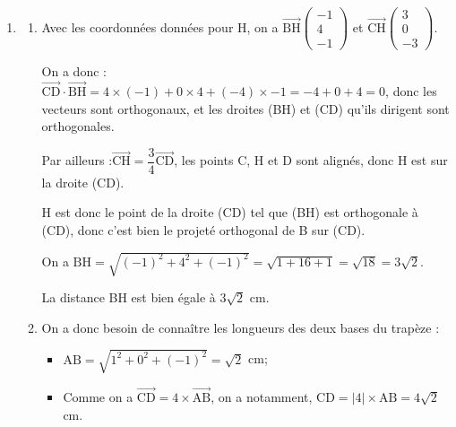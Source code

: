 \documentclass[10pt]{article}
\providecommand{\vect}[1]{\overrightarrow{#1}}
\providecommand{\Oijk}{\(\mathrm{O};\vec{\imath},\vec{\jmath},\vec{k}\)}
\begin{document}
\begin{enumerate}
\begin{enumerate}
	Dans le repère orthonormé \Oijk{}, on a donc :

	$\begin{aligned}[t] \mathrm{SI} &= \sqrt{\left(x_\mathrm{I} - x_{\mathrm{S}}\right)^2 +\left(y_\mathrm{I} - y_{\mathrm{S}}\right)^2 +\left(z_\mathrm{I} - z_{\mathrm{S}}\right)^2 } = \sqrt{\left(\dfrac{2}{3}-2\right)^2 + \left(\dfrac{1}{3} - 1\right)^2 + \left(\dfrac{8}{3} - 4\right)^2   } \\
	&=\sqrt{\left(-\dfrac{4}{3}\right)^2 + \left(-\dfrac{2}{3}\right)^2 + \left(-\dfrac{4}{3}\right)^2  } = \sqrt{\dfrac{16}{9}+\dfrac{4}{9} + \dfrac{16}{9}} = \sqrt{\dfrac{36}{9}} = \sqrt{4} = 2 \end{aligned}$

	On arrive bien à SI = 2 unités graphique, et comme \Oijk{} est d'unité graphique 1 cm, on a bien SI = 2 cm.
\end{enumerate}
\item \begin{enumerate}
	\item Avec les coordonnées données pour H, on a $\vect{\mathrm{BH}} \begin{pmatrix}-1 \\ 4\\-1\end{pmatrix}$ et $\vect{\mathrm{CH}} \begin{pmatrix}3 \\ 0\\-3\end{pmatrix}$.

	On a donc : \quad $\vect{\mathrm{CD}}\cdot\vect{\mathrm{BH}} = 4\times (-1) + 0\times 4 + (-4) \times -1 = -4 + 0 + 4 = 0$, donc les vecteurs sont orthogonaux, et les droites (BH) et (CD) qu'ils dirigent sont orthogonales.

	Par ailleurs  :\quad $\vect{\mathrm{CH}} = \dfrac{3}{4}\vect{\mathrm{CD}}$, les points C, H et D sont alignés, donc H est sur la droite (CD).

	H est donc le point de la droite (CD) tel que (BH) est orthogonale à (CD), donc c'est bien le projeté orthogonal de B sur (CD).

	On a $\mathrm{BH} = \sqrt{(-1)^2 + 4^2 + (-1)^2 } = \sqrt{1 + 16 + 1} = \sqrt{18} = 3\sqrt{2}$.

	La distance BH est bien égale à $3\sqrt{2}$ cm.

	\item On a donc besoin de connaître les longueurs des deux bases du trapèze :
	\begin{itemize}
		\item $\mathrm{AB} = \sqrt{1^2 + 0^2 + (-1)^2} = \sqrt{2}$ cm;
		\item Comme on a $\vect{\mathrm{CD}} = 4\times \vect{\mathrm{AB}}$, on a notamment, $\mathrm{CD} = \left|4\right|\times \mathrm{AB} = 4\sqrt{2}$ cm.
	\end{itemize}


\end{enumerate}
\end{enumerate}
\end{document}
